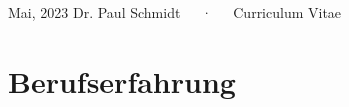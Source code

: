 \documentclass[11pt,a4paper,]{awesome-cv}
\begin{document}
\makecvheader

\makecvfooter
  {Mai, 2023}
    {Dr. Paul Schmidt~~~·~~~Curriculum Vitae}
  {\thepage}






\hypertarget{berufserfahrung}{%
\section{Berufserfahrung}\label{berufserfahrung}}
\end{document}
